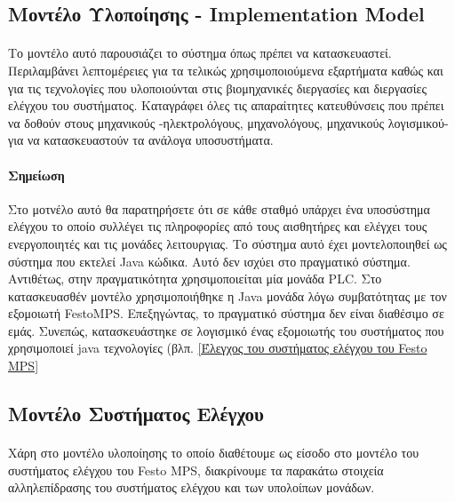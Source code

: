 \documentclass[a4paper,12pt,twoside]{report}
\begin{document}
{%
			\subsection{Μοντέλο Υλοποίησης - Implementation Model}
			
				\paragraph{} {Το μοντέλο αυτό παρουσιάζει το σύστημα όπως πρέπει να κατασκευαστεί. Περιλαμβάνει λεπτομέρειες για τα τελικώς χρησιμοποιούμενα εξαρτήματα καθώς και για τις τεχνολογίες που υλοποιούνται στις βιομηχανικές διεργασίες και διεργασίες ελέγχου του συστήματος. Καταγράφει όλες τις απαραίτητες κατευθύνσεις που πρέπει να δοθούν στους μηχανικούς -ηλεκτρολόγους, μηχανολόγους, μηχανικούς λογισμικού- για να κατασκευαστούν τα ανάλογα υποσυστήματα.
				}
				
				\paragraph{Σημείωση} {Στο μοτνέλο αυτό θα παρατηρήσετε ότι σε κάθε σταθμό υπάρχει ένα υποσύστημα ελέγχου το οποίο συλλέγει τις πληροφορίες από τους αισθητήρες και ελέγχει τους ενεργοποιητές και τις μονάδες λειτουργιας. Το σύστημα αυτό έχει μοντελοποιηθεί ως σύστημα που εκτελεί Java κώδικα. Αυτό δεν ισχύει στο πραγματικό σύστημα. Αντιθέτως, στην πραγματικότητα χρησιμοποιείται μία μονάδα PLC. Στο κατασκευασθέν μοντέλο χρησιμοποιήθηκε η Java μονάδα λόγω συμβατότητας με τον εξομοιωτή FestoMPS. Επεξηγώντας, το πραγματικό σύστημα δεν είναι διαθέσιμο σε εμάς. Συνεπώς, κατασκευάστηκε σε λογισμικό ένας εξομοιωτής του συστήματος που χρησιμοποιεί java τεχνολογίες {\footnotesize (βλπ. \ref{Έλεγχος του συστήματος ελέγχου του Festo MPS}}
				}
				
			\subsection{Μοντέλο Συστήματος Ελέγχου}
			
				\paragraph{} {Χάρη στο μοντέλο υλοποίησης το οποίο διαθέτουμε ως είσοδο στο μοντέλο του συστήματος ελέγχου του Festo MPS\textregistered, διακρίνουμε τα παρακάτω στοιχεία αλληλεπίδρασης του συστήματος ελέγχου και των υπολοίπων μονάδων.
				}
				
}
\end{document}
